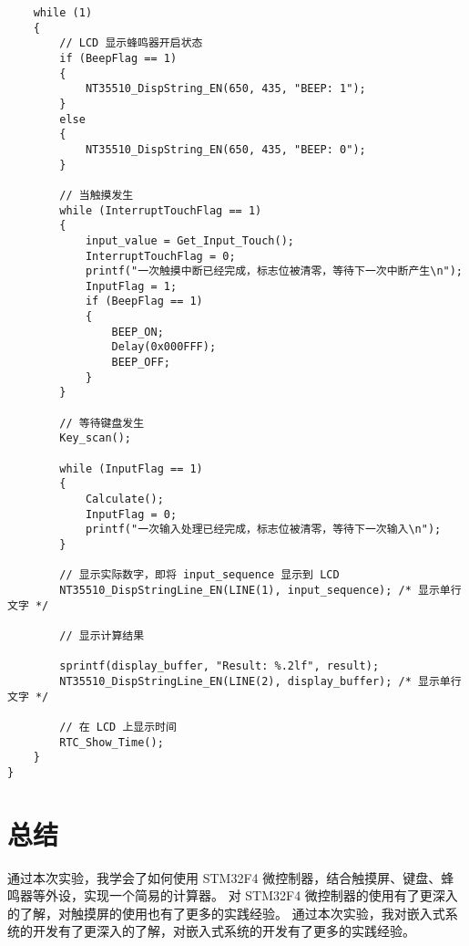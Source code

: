 \documentclass{course-thesis/theme-2639013-final}
\begin{document}
\begin{verbatim}
    while (1)
    {
        // LCD 显示蜂鸣器开启状态
        if (BeepFlag == 1)
        {
            NT35510_DispString_EN(650, 435, "BEEP: 1");
        }
        else
        {
            NT35510_DispString_EN(650, 435, "BEEP: 0");
        }

        // 当触摸发生
        while (InterruptTouchFlag == 1)
        {
            input_value = Get_Input_Touch();
            InterruptTouchFlag = 0;
            printf("一次触摸中断已经完成，标志位被清零，等待下一次中断产生\n");
            InputFlag = 1;
            if (BeepFlag == 1)
            {
                BEEP_ON;
                Delay(0x000FFF);
                BEEP_OFF;
            }
        }

        // 等待键盘发生
        Key_scan();

        while (InputFlag == 1)
        {
            Calculate();
            InputFlag = 0;
            printf("一次输入处理已经完成，标志位被清零，等待下一次输入\n");
        }

        // 显示实际数字，即将 input_sequence 显示到 LCD
        NT35510_DispStringLine_EN(LINE(1), input_sequence); /* 显示单行文字 */

        // 显示计算结果

        sprintf(display_buffer, "Result: %.2lf", result);
        NT35510_DispStringLine_EN(LINE(2), display_buffer); /* 显示单行文字 */

        // 在 LCD 上显示时间
        RTC_Show_Time();
    }
}
\end{verbatim}

\section{总结}

通过本次实验，我学会了如何使用 STM32F4 微控制器，结合触摸屏、键盘、蜂鸣器等外设，实现一个简易的计算器。
对 STM32F4 微控制器的使用有了更深入的了解，对触摸屏的使用也有了更多的实践经验。
通过本次实验，我对嵌入式系统的开发有了更深入的了解，对嵌入式系统的开发有了更多的实践经验。
\end{document}
